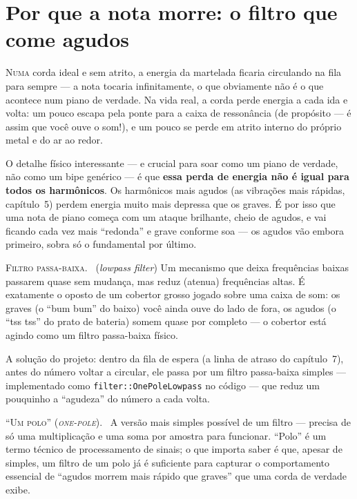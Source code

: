 \documentclass[11pt,oneside]{book}
\newcommand{\nova}[1]{\textsc{\color{accent}#1.}~}
\newcommand{\opening}[2]{\lettrine[lines=2,loversize=0.08,lraise=0.02]{#1}{#2}}
\begin{document}
\chapter{Por que a nota morre: o filtro que come agudos}

\opening{N}{uma} corda ideal e sem atrito, a energia da martelada ficaria
circulando na fila para sempre --- a nota tocaria infinitamente, o que
obviamente não é o que acontece num piano de verdade. Na vida real, a corda
perde energia a cada ida e volta: um pouco escapa pela ponte para a caixa
de ressonância (de propósito --- é assim que você ouve o som!), e um pouco
se perde em atrito interno do próprio metal e do ar ao redor.

O detalhe físico interessante --- e crucial para soar como um piano de
verdade, não como um bipe genérico --- é que \textbf{essa perda de energia
não é igual para todos os harmônicos}. Os harmônicos mais agudos (as
vibrações mais rápidas, capítulo~5) perdem energia muito mais depressa que
os graves. É por isso que uma nota de piano começa com um ataque
brilhante, cheio de agudos, e vai ficando cada vez mais \enquote{redonda} e
grave conforme soa --- os agudos vão embora primeiro, sobra só o
fundamental por último.

\begin{newword}
\nova{Filtro passa-baixa} (\emph{lowpass filter}) Um mecanismo que deixa
frequências baixas passarem quase sem mudança, mas reduz (atenua)
frequências altas. É exatamente o oposto de um cobertor grosso jogado sobre
uma caixa de som: os graves (o \enquote{bum bum} do baixo) você ainda ouve
do lado de fora, os agudos (o \enquote{tss tss} do prato de bateria) somem
quase por completo --- o cobertor está agindo como um filtro passa-baixa
físico.
\end{newword}

A solução do projeto: dentro da fila de espera (a linha de atraso do
capítulo~7), antes do número voltar a circular, ele passa por um filtro
passa-baixa simples --- implementado como \texttt{filter::OnePoleLowpass}
no código --- que reduz um pouquinho a \enquote{agudeza} do número a cada
volta.

\begin{newword}
\nova{\enquote{Um polo} (\emph{one-pole})} A versão mais simples possível
de um filtro --- precisa de só uma multiplicação e uma soma por amostra
para funcionar. \enquote{Polo} é um termo técnico de processamento de
sinais; o que importa saber é que, apesar de simples, um filtro de um polo
já é suficiente para capturar o comportamento essencial de \enquote{agudos
morrem mais rápido que graves} que uma corda de verdade exibe.
\end{newword}
\end{document}
